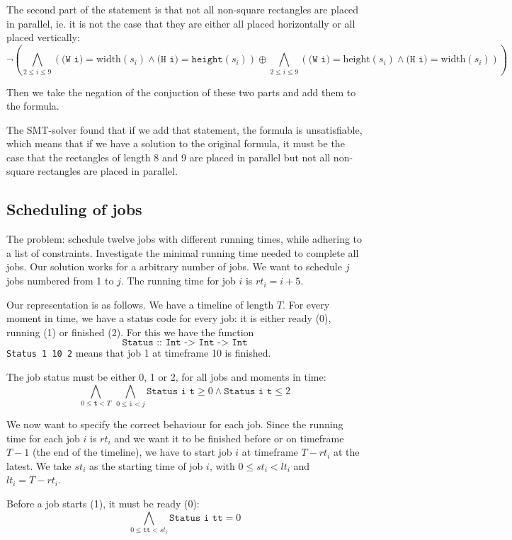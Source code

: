\documentclass[12pt]{article}
\begin{document}
The second part of the statement is that 
not all non-square rectangles are placed in parallel, 
ie. it is not the case that they are either all placed horizontally or all placed vertically:
\[
\neg
\left(
\bigwedge_{2 \le i \le 9}
\left( 
\texttt{(W i)} = \text{width}(s_i) \wedge \texttt{(H i)} = \texttt{height}(s_i)
\right)
\oplus
\bigwedge_{2 \le i \le 9}
\left(
\texttt{(W i)} = \text{height}(s_i) \wedge \texttt{(H i)} = \text{width}(s_i)
\right)
\right)
\]

Then we take the negation of the conjuction of these two parts and add them to the formula.

The SMT-solver found that if we add that statement, the formula is unsatisfiable, which means that if we have a solution to the original formula, it must be the case that the rectangles of length 8 and 9 are placed in parallel but not all non-square rectangles are placed in parallel.


\subsection*{Scheduling of jobs}
The problem: schedule twelve jobs with different running times, while adhering to a list of constraints.
Investigate the minimal running time needed to complete all jobs.
Our solution works for a arbitrary number of jobs.
We want to schedule $j$ jobs numbered from 1 to $j$.
The running time for job $i$ is $rt_i = i+5$.

Our representation is as follows.
We have a timeline of length $T$.
For every moment in time, we have a status code for every job: it is either ready (0), running (1) or finished (2). 
For this we have the function 
\[\texttt{Status :: Int -> Int -> Int}\]
\texttt{Status 1 10 2} means that job 1 at timeframe 10 is finished. 

The job status must be either 0, 1 or 2, for all jobs and moments in time:
\[ \bigwedge_{0 \le \texttt{t} < T} ~ \bigwedge_{0 \le \texttt{i} < j} \texttt{Status i t} \ge 0\wedge \texttt{Status i t} \le 2\]

We now want to specify the correct behaviour for each job. 
Since the running time for each job $i$ is $rt_i$ and we want it to be finished before or on timeframe $T-1$ (the end of the timeline), we have to start job $i$ at timeframe $T - rt_i$ at the latest.
We take $st_i$ as the starting time of job $i$, with $0 \le st_i < lt_i$ and $lt_i = T-rt_i$.

Before a job starts (1), it must be ready (0):
\[ \bigwedge_{0 \le \texttt{tt} < st_i} \texttt{Status i tt} = 0 \]
\end{document}
